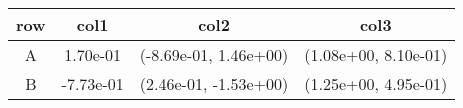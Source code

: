 \begin{tabular}{cccc}
\toprule
row&col1&col2&col3\tabularnewline
\midrule
A&1.70e-01& (-8.69e-01, 1.46e+00)& (1.08e+00, 8.10e-01)\tabularnewline
B&-7.73e-01& (2.46e-01, -1.53e+00)& (1.25e+00, 4.95e-01)\tabularnewline
\bottomrule
\end{tabular}
